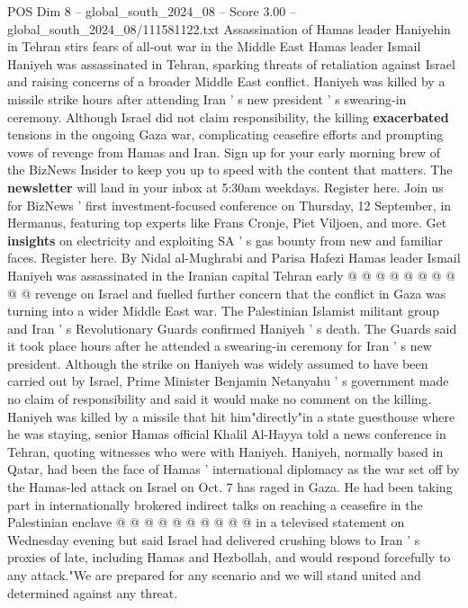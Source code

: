 \begin{textsample}{POS Dim 8 – global\_south\_2024\_08 – Score 3.00 – global\_south\_2024\_08/111581122.txt}  \label{ex:f8_pos_377}
Assassination of Hamas leader Haniyehin in Tehran stirs fears of all-out war in the Middle East Hamas leader Ismail Haniyeh was assassinated in Tehran, sparking threats of retaliation against Israel and raising concerns of a broader Middle East conflict.
Haniyeh was killed by a missile strike hours after attending Iran ' s new president ' s swearing-in ceremony.
Although Israel did not claim responsibility, the killing \textbf{exacerbated} tensions in the ongoing Gaza war, complicating ceasefire efforts and prompting vows of revenge from Hamas and Iran.
Sign up for your early morning brew of the BizNews Insider to keep you up to speed with the content that matters.
The \textbf{newsletter} will land in your inbox at 5:30am weekdays.
Register here.
Join us for BizNews ' first investment-focused conference on Thursday, 12 September, in Hermanus, featuring top experts like Frans Cronje, Piet Viljoen, and more.
Get \textbf{insights} on electricity and exploiting SA ' s gas bounty from new and familiar faces.
Register here.
By Nidal al-Mughrabi and Parisa Hafezi Hamas leader Ismail Haniyeh was assassinated in the Iranian capital Tehran early @ @ @ @ @ @ @ @ @ @ revenge on Israel and fuelled further concern that the conflict in Gaza was turning into a wider Middle East war.
The Palestinian Islamist militant group and Iran ' s Revolutionary Guards confirmed Haniyeh ' s death.
The Guards said it took place hours after he attended a swearing-in ceremony for Iran ' s new president.
Although the strike on Haniyeh was widely assumed to have been carried out by Israel, Prime Minister Benjamin Netanyahu ' s government made no claim of responsibility and said it would make no comment on the killing.
Haniyeh was killed by a missile that hit him"directly"in a state guesthouse where he was staying, senior Hamas official Khalil Al-Hayya told a news conference in Tehran, quoting witnesses who were with Haniyeh.
Haniyeh, normally based in Qatar, had been the face of Hamas ' international diplomacy as the war set off by the Hamas-led attack on Israel on Oct. 7 has raged in Gaza.
He had been taking part in internationally brokered indirect talks on reaching a ceasefire in the Palestinian enclave @ @ @ @ @ @ @ @ @ @ in a televised statement on Wednesday evening but said Israel had delivered crushing blows to Iran ' s proxies of late, including Hamas and Hezbollah, and would respond forcefully to any attack."We are prepared for any scenario and we will stand united and determined against any threat.

\end{textsample}
